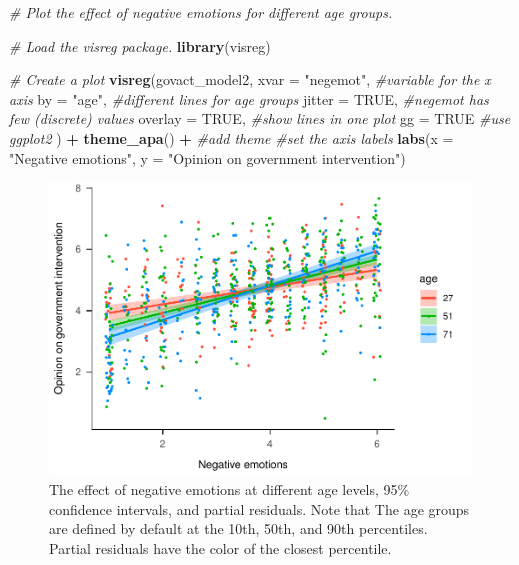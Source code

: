 \documentclass[doc,floatsintext]{apa6}
\newenvironment{Shaded}{\begin{snugshade}}{\end{snugshade}}
\newcommand{\KeywordTok}[1]{\textcolor[rgb]{0.13,0.29,0.53}{\textbf{#1}}}
\newcommand{\DataTypeTok}[1]{\textcolor[rgb]{0.13,0.29,0.53}{#1}}
\newcommand{\StringTok}[1]{\textcolor[rgb]{0.31,0.60,0.02}{#1}}
\newcommand{\CommentTok}[1]{\textcolor[rgb]{0.56,0.35,0.01}{\textit{#1}}}
\newcommand{\OtherTok}[1]{\textcolor[rgb]{0.56,0.35,0.01}{#1}}
\newcommand{\OperatorTok}[1]{\textcolor[rgb]{0.81,0.36,0.00}{\textbf{#1}}}
\newcommand{\NormalTok}[1]{#1}
\begin{document}
\begin{Shaded}
\begin{Highlighting}[]
\CommentTok{# Plot the effect of negative emotions for different age groups.}

\CommentTok{# Load the visreg package.}
\KeywordTok{library}\NormalTok{(visreg)}

\CommentTok{# Create a plot}
\KeywordTok{visreg}\NormalTok{(govact_model2, }
       \DataTypeTok{xvar =} \StringTok{"negemot"}\NormalTok{, }\CommentTok{#variable for the x axis}
       \DataTypeTok{by =} \StringTok{"age"}\NormalTok{, }\CommentTok{#different lines for age groups}
       \DataTypeTok{jitter =} \OtherTok{TRUE}\NormalTok{, }\CommentTok{#negemot has few (discrete) values}
       \DataTypeTok{overlay =} \OtherTok{TRUE}\NormalTok{, }\CommentTok{#show lines in one plot}
       \DataTypeTok{gg =} \OtherTok{TRUE} \CommentTok{#use ggplot2}
\NormalTok{       ) }\OperatorTok{+}
\StringTok{  }\KeywordTok{theme_apa}\NormalTok{() }\OperatorTok{+}\StringTok{ }\CommentTok{#add theme}
\StringTok{  }\CommentTok{#set the axis labels}
\StringTok{  }\KeywordTok{labs}\NormalTok{(}\DataTypeTok{x =} \StringTok{"Negative emotions"}\NormalTok{,}
       \DataTypeTok{y =} \StringTok{"Opinion on government intervention"}\NormalTok{)}
\end{Highlighting}
\end{Shaded}

\begin{figure}[H]
\centering
\includegraphics{HelpMyCollaboratorUsesR_files/figure-latex/plotregline-1.pdf}
\caption{\label{fig:plotregline}The effect of negative emotions at different
age levels, 95\% confidence intervals, and partial residuals. Note that
The age groups are defined by default at the 10th, 50th, and 90th
percentiles. Partial residuals have the color of the closest
percentile.}
\end{figure}
\end{document}
